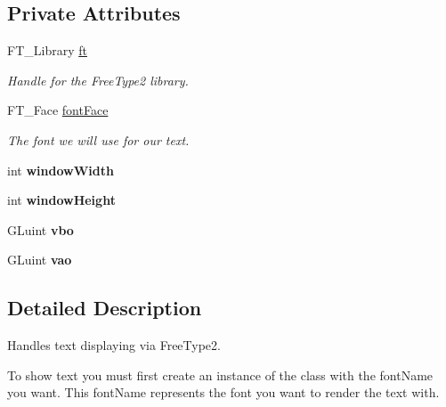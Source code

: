 \subsection*{Private Attributes}
\begin{DoxyCompactItemize}
\item 
\hypertarget{class_text_a1ed42a3a630ff566afd473073ec99a67}{F\-T\-\_\-\-Library \hyperlink{class_text_a1ed42a3a630ff566afd473073ec99a67}{ft}}\label{class_text_a1ed42a3a630ff566afd473073ec99a67}

\begin{DoxyCompactList}\small\item\em Handle for the Free\-Type2 library. \end{DoxyCompactList}\item 
\hypertarget{class_text_afc0ad7d45ce84e128f592c7296822943}{F\-T\-\_\-\-Face \hyperlink{class_text_afc0ad7d45ce84e128f592c7296822943}{font\-Face}}\label{class_text_afc0ad7d45ce84e128f592c7296822943}

\begin{DoxyCompactList}\small\item\em The font we will use for our text. \end{DoxyCompactList}\item 
\hypertarget{class_text_ae3df36c5365c7e232bc6158da9a4b4f1}{int {\bfseries window\-Width}}\label{class_text_ae3df36c5365c7e232bc6158da9a4b4f1}

\item 
\hypertarget{class_text_acbe250a47f5dfbdc316d6f4349e6b63a}{int {\bfseries window\-Height}}\label{class_text_acbe250a47f5dfbdc316d6f4349e6b63a}

\item 
\hypertarget{class_text_a5e8c2cf48646dc7f08d134044f3707d7}{G\-Luint {\bfseries vbo}}\label{class_text_a5e8c2cf48646dc7f08d134044f3707d7}

\item 
\hypertarget{class_text_a4f658f0a71a146904a24a0162ad6477f}{G\-Luint {\bfseries vao}}\label{class_text_a4f658f0a71a146904a24a0162ad6477f}

\end{DoxyCompactItemize}


\subsection{Detailed Description}
Handles text displaying via Free\-Type2. 

To show text you must first create an instance of the class with the {\ttfamily font\-Name} you want. This {\ttfamily font\-Name} represents the font you want to render the text with.


